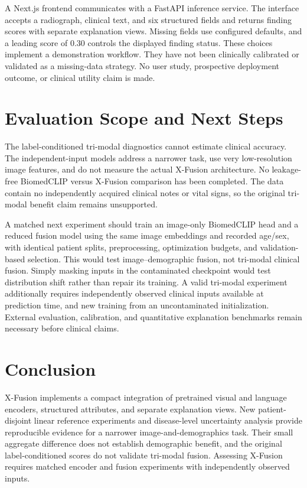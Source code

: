\documentclass[runningheads,a4paper]{llncs}
\begin{document}
A Next.js frontend communicates with a FastAPI inference service. The interface accepts a radiograph, clinical text, and six structured fields and returns finding scores with separate explanation views. Missing fields use configured defaults, and a leading score of 0.30 controls the displayed finding status. These choices implement a demonstration workflow. They have not been clinically calibrated or validated as a missing-data strategy. No user study, prospective deployment outcome, or clinical utility claim is made.

\section{Evaluation Scope and Next Steps}
The label-conditioned tri-modal diagnostics cannot estimate clinical accuracy. The independent-input models address a narrower task, use very low-resolution image features, and do not measure the actual X-Fusion architecture. No leakage-free BiomedCLIP versus X-Fusion comparison has been completed. The data contain no independently acquired clinical notes or vital signs, so the original tri-modal benefit claim remains unsupported.

A matched next experiment should train an image-only BiomedCLIP head and a reduced fusion model using the same image embeddings and recorded age/sex, with identical patient splits, preprocessing, optimization budgets, and validation-based selection. This would test image--demographic fusion, not tri-modal clinical fusion. Simply masking inputs in the contaminated checkpoint would test distribution shift rather than repair its training. A valid tri-modal experiment additionally requires independently observed clinical inputs available at prediction time, and new training from an uncontaminated initialization. External evaluation, calibration, and quantitative explanation benchmarks remain necessary before clinical claims.

\section{Conclusion}
X-Fusion implements a compact integration of pretrained visual and language encoders, structured attributes, and separate explanation views. New patient-disjoint linear reference experiments and disease-level uncertainty analysis provide reproducible evidence for a narrower image-and-demographics task. Their small aggregate difference does not establish demographic benefit, and the original label-conditioned scores do not validate tri-modal fusion. Assessing X-Fusion requires matched encoder and fusion experiments with independently observed inputs.



\end{document}
